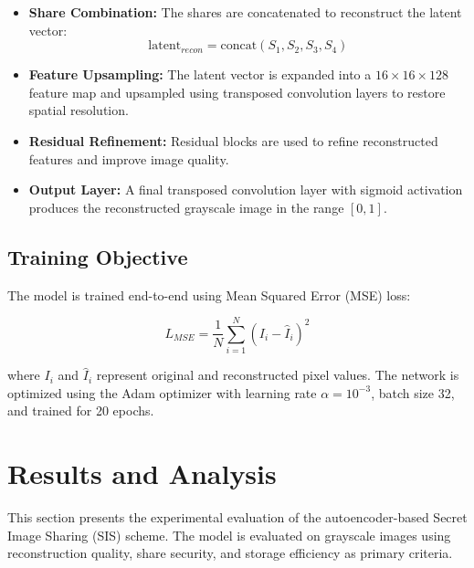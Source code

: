 \begin{itemize}
    \item \textbf{Share Combination:} The shares are concatenated to reconstruct the latent vector:
    \begin{equation}
\text{latent}_{recon} = \text{concat}(S_1, S_2, S_3, S_4)
\end{equation}

    \item \textbf{Feature Upsampling:} The latent vector is expanded into a $16 \times 16 \times 128$ feature map and upsampled using transposed convolution layers to restore spatial resolution.

    \item \textbf{Residual Refinement:} Residual blocks are used to refine reconstructed features and improve image quality.

    \item \textbf{Output Layer:} A final transposed convolution layer with sigmoid activation produces the reconstructed grayscale image in the range $[0,1]$.
\end{itemize}

\subsection{Training Objective}

The model is trained end-to-end using Mean Squared Error (MSE) loss:

\begin{equation}
L_{MSE} = \frac{1}{N} \sum_{i=1}^{N} (I_i - \hat{I}_i)^2
\end{equation}

where $I_i$ and $\hat{I}_i$ represent original and reconstructed pixel values. The network is optimized using the Adam optimizer with learning rate $\alpha = 10^{-3}$, batch size 32, and trained for 20 epochs.


\section{Results and Analysis}
\label{sec:lad-results}

This section presents the experimental evaluation of the autoencoder-based Secret Image Sharing (SIS) scheme. The model is evaluated on grayscale images using reconstruction quality, share security, and storage efficiency as primary criteria.

